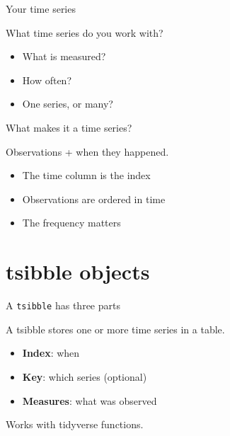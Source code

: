 \documentclass[
  14pt,
  ignorenonframetext,
  aspectratio=169,
]{beamer}
\providecommand{\tightlist}{%
  \setlength{\itemsep}{0pt}\setlength{\parskip}{0pt}}
\begin{document}
\begin{frame}{Your time series}
\protect{}\label{your-time-series}
\begin{block}{}\Large
What time series do you work with?
\end{block}

\pause

\begin{itemize}
\tightlist
\item
  What is measured?
\item
  How often?
\item
  One series, or many?
\end{itemize}
\end{frame}

\begin{frame}{What makes it a time series?}
\protect{}\label{what-makes-it-a-time-series}
\begin{block}{}
Observations + \alert{when} they happened.
\end{block}

\begin{itemize}
\tightlist
\item
  The time column is the \alert{index}
\item
  Observations are ordered in time
\item
  The frequency matters
\end{itemize}
\end{frame}

\section{tsibble objects}\label{tsibble-objects}

\begin{frame}{A \texttt{tsibble} has three parts}
\protect{}\label{a-tsibble-has-three-parts}
\begin{block}{}
A \alert{tsibble} stores one or more time series in a table.
\end{block}

\begin{itemize}
\tightlist
\item
  \textbf{Index}: when
\item
  \textbf{Key}: which series (optional)
\item
  \textbf{Measures}: what was observed
\end{itemize}

\vspace*{0.3cm}

Works with tidyverse functions.
\end{frame}
\end{document}
